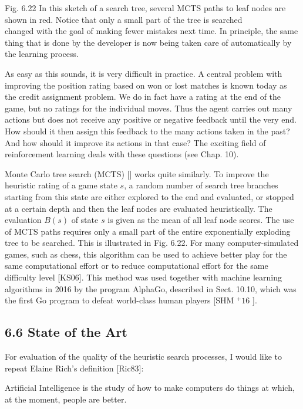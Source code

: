 \documentclass[10pt]{article}
\begin{document}
Fig. 6.22 In this sketch of a search tree, several MCTS paths to leaf nodes are shown in red. Notice that only a small part of the tree is searched\\

changed with the goal of making fewer mistakes next time. In principle, the same thing that is done by the developer is now being taken care of automatically by the learning process.

As easy as this sounds, it is very difficult in practice. A central problem with improving the position rating based on won or lost matches is known today as the credit assignment problem. We do in fact have a rating at the end of the game, but no ratings for the individual moves. Thus the agent carries out many actions but does not receive any positive or negative feedback until the very end. How should it then assign this feedback to the many actions taken in the past? And how should it improve its actions in that case? The exciting field of reinforcement learning deals with these questions (see Chap. 10).

Monte Carlo tree search (MCTS) [\cite{kocsis2006bandit}] works quite similarly. To improve the heuristic rating of a game state $s$, a random number of search tree branches starting from this state are either explored to the end and evaluated, or stopped at a certain depth and then the leaf nodes are evaluated heuristically. The evaluation $B(s)$ of state $s$ is given as the mean of all leaf node scores. The use of MCTS paths requires only a small part of the entire exponentially exploding tree to be searched. This is illustrated in Fig. 6.22. For many computer-simulated games, such as chess, this algorithm can be used to achieve better play for the same computational effort or to reduce computational effort for the same difficulty level [KS06]. This method was used together with machine learning algorithms in 2016 by the program AlphaGo, described in Sect. 10.10, which was the first Go program to defeat world-class human players [SHM ${ }^{+} 16$ ].

\subsection*{6.6 State of the Art}
For evaluation of the quality of the heuristic search processes, I would like to repeat Elaine Rich's definition [Ric83]:

Artificial Intelligence is the study of how to make computers do things at which, at the moment, people are better.
\end{document}

